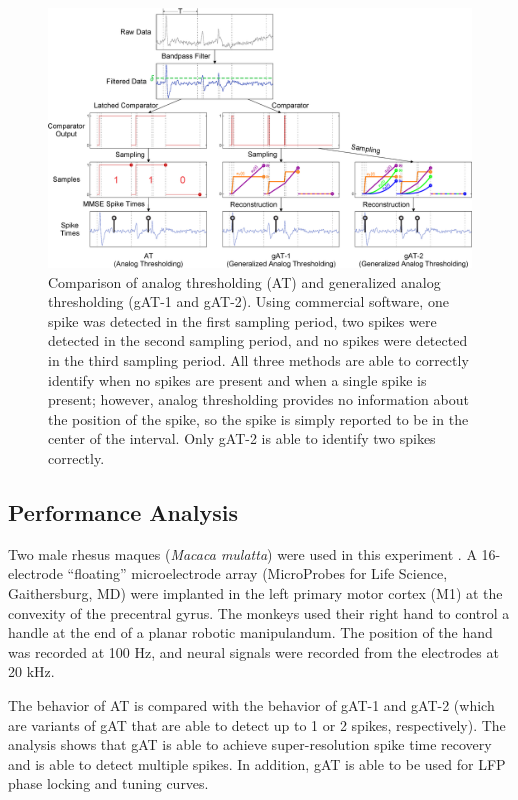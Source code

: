 \documentclass[10 pt]{article}
\begin{document}
\begin{figure}[htbp]
\begin{center}
\includegraphics[scale=0.30]{at_gat.eps}
\caption{Comparison of analog thresholding (AT) and generalized analog thresholding (gAT-1 and gAT-2). Using commercial software, one spike was detected in the first sampling period, two spikes were detected in the second sampling period, and no spikes were detected in the third sampling period. All three methods are able to correctly identify when no spikes are present and when a single spike is present; however, analog thresholding provides no information about the position of the spike, so the spike is simply reported to be in the center of the interval. Only gAT-2 is able to identify two spikes correctly.} %
\label{fig:at_gat}
\end{center}
\end{figure}

\subsection{Performance Analysis}

Two male rhesus maques (\textit{Macaca mulatta}) were used in this experiment \cite{RLP2008, RBB2012}.
A 16-electrode ``floating'' microelectrode array (MicroProbes for Life Science, Gaithersburg, MD) were implanted in the left primary motor cortex (M1) at the convexity of the precentral gyrus.
The monkeys used their right hand to control a handle at the end of a planar robotic manipulandum.
The position of the hand was recorded at 100 Hz, and neural signals were recorded from the electrodes at 20 kHz.

The behavior of AT is compared with the behavior of gAT-1 and gAT-2 (which are variants of gAT that are able to detect up to 1 or 2 spikes, respectively).
The analysis shows that gAT is able to achieve super-resolution spike time recovery and is able to detect multiple spikes.
In addition, gAT is able to be used for LFP phase locking and tuning curves.
\end{document}
